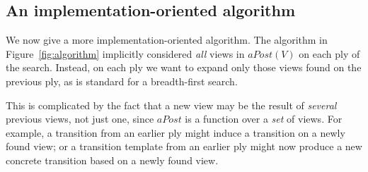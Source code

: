 \subsection{An implementation-oriented algorithm}
\label{ssec:algorithm-2}

We now give a more implementation-oriented algorithm.  The algorithm in
Figure~\ref{fig:algorithm} implicitly considered \emph{all} views in
$aPost(V)$ on each ply of the search.  Instead, on each ply we want to expand
only those views found on the previous ply, as is standard for a breadth-first
search.  

This is complicated by the fact that a new view may be the result of
\emph{several} previous views, not just one, since $aPost$ is a
function over a \emph{set} of views.  For example, a transition from an
earlier ply might induce a transition on a newly found view; or a transition
template from an earlier ply might now produce a new concrete transition based
on a newly found view.  



